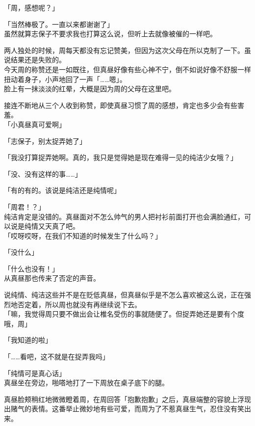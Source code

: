 「周，感想呢？」

「当然棒极了。一直以来都谢谢了」\\

虽然就算志保子不要求我也打算这么说，但听上去就像被催的一样吧。

两人独处的时候，周每天都没有忘记赞美，但因为这次父母在所以克制了一下。虽说结果还是失败的。\\

今天周的称赞还是一如既往，但真昼好像有些心神不宁，倒不如说好像不舒服一样扭动着身子，小声地回了一声「……嗯」。\\

脸上有一抹淡淡的红晕，大概是因为周的父母在这里吧。

接连不断地从三个人收到称赞，即使真昼习惯了周的感想，肯定也多少会有些害羞。\\

「小真昼真可爱啊」

「志保子，别太捉弄她了」

「我没打算捉弄她啊。真的，我只是觉得她是现在难得一见的纯洁少女哦？」

「没、没有这样的事……」

「有的有的。该说是纯洁还是纯情呢」

「周君！？」\\

纯洁肯定是没错的。真昼面对不怎么帅气的男人把衬衫前面打开也会满脸通红，可以说是纯情又天真了吧。\\

「哎呀哎呀，在我们不知道的时候发生了什么吗？」

「没什么」

「什么也没有！」\\

从真昼那也传来了否定的声音。

说纯情、纯洁这些并不是在贬低真昼，但真昼似乎是不怎么喜欢被这么说，正在强烈地否定着，所以周也就没有再继续说下去。\\

「嘛，我觉得周只要不做出会让椎名受伤的事就随便了。但捉弄她还是要有个度哦，周」

「我知道的啦」

「……看吧，这不就是在捉弄我吗」

「纯情可是真心话」\\

真昼坐在旁边，啪嗒地打了一下周放在桌子底下的腿。

真昼脸颊稍红地微微瞪着周，在周回答「抱歉抱歉」之后，真昼端整的容貌上浮现出赌气的表情。这番举止微妙地有些可爱，而周为了不惹真昼生气，忍住没有笑出来。\\

